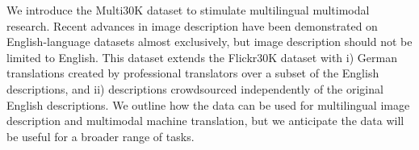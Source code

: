 We introduce the Multi30K dataset to stimulate multilingual multimodal research. Recent advances in image description have been demonstrated on English-language datasets almost exclusively, but image description should not be limited to English. This dataset extends the Flickr30K dataset with i) German translations created by professional translators over a subset of the English descriptions, and ii) descriptions crowdsourced independently of the original English descriptions. We outline how the data can be used for multilingual image description and multimodal machine translation, but we anticipate the data will be useful for a broader range of tasks.

